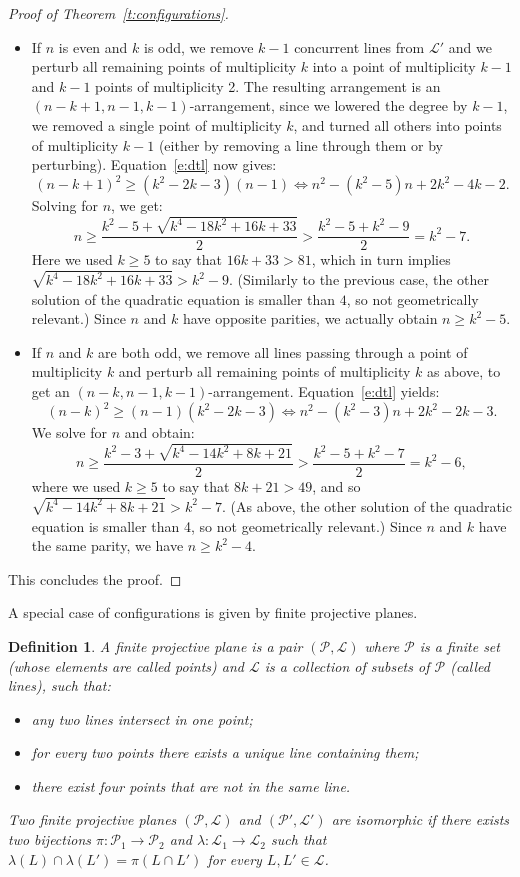 \documentclass[a4paper,12pt, onesided]{amsart}
\newtheorem{defn}[thm]{Definition}
\theoremstyle{remark}
\numberwithin{figure}{section}
\numberwithin{equation}{section}
\renewcommand{\L}{\mathcal{L}}
\newcommand{\co}{\colon}
\begin{document}
\begin{proof}[Proof of Theorem~\ref{t:configurations}]
\begin{itemize}
\item If $n$ is even and $k$ is odd, we remove $k-1$ concurrent lines from $\L'$ and we perturb all remaining points of multiplicity $k$ into a point of multiplicity $k-1$ and $k-1$ points of multiplicity 2. The resulting arrangement is an $(n-k+1,n-1,k-1)$-arrangement, since we lowered the degree by $k-1$, we removed a single point of multiplicity $k$, and turned all others into points of multiplicity $k-1$ (either by removing a line through them or by perturbing). Equation~\eqref{e:dtl} now gives:
\[
(n-k+1)^2 \ge (k^2-2k-3)(n-1)  \Longleftrightarrow  n^2 - (k^2-5)n + 2k^2-4k-2.
\]
Solving for $n$, we get:
\[
n \ge \frac{k^2 - 5 + \sqrt{k^4-18k^2 + 16k + 33}}2 > \frac{k^2 - 5 + k^2- 9}2 = k^2-7.
\]
Here we used $k \ge 5$ to say that $16k+33 > 81$, which in turn implies $\sqrt{k^4-18k^2 + 16k + 33} > k^2-9$.
(Similarly to the previous case, the other solution of the quadratic equation is smaller than $4$, so not geometrically relevant.)
Since $n$ and $k$ have opposite parities, we actually obtain $n \ge k^2-5$.

\item If $n$ and $k$ are both odd, we remove all lines passing through a point of multiplicity $k$ and perturb all remaining points of multiplicity $k$ as above, to get an $(n-k,n-1,k-1)$-arrangement.
Equation~\eqref{e:dtl} yields:
\[
(n-k)^2 \ge (n-1)(k^2-2k-3) \Longleftrightarrow n^2 - (k^2-3)n + 2k^2-2k-3.
\]
We solve for $n$ and obtain:
\[
n \ge \frac{k^2 - 3 + \sqrt{k^4-14k^2 + 8k + 21}}2 > \frac{k^2 - 5 + k^2- 7}2 = k^2-6,
\]
where we used $k \ge 5$ to say that $8k+21 > 49$, and so $\sqrt{k^4-14k^2 + 8k + 21} > k^2-7$.
(As above, the other solution of the quadratic equation is smaller than 4, so not geometrically relevant.)
Since $n$ and $k$ have the same parity, we have $n \ge k^2-4$.
\end{itemize}
This concludes the proof.
\end{proof}

A special case of configurations is given by finite projective planes.

\begin{defn}
A \emph{finite projective plane} is a pair $(\mathcal{P}, \L)$ where $\mathcal{P}$ is a finite set (whose elements are called \emph{points}) and $\mathcal{L}$ is a collection of subsets of $\mathcal{P}$ (called \emph{lines}), such that:
\begin{itemize}
\item any two lines intersect in one point;
\item for every two points there exists a unique line containing them;
\item there exist four points that are not in the same line.
\end{itemize}
Two finite projective planes $(\mathcal{P}, \L)$ and $(\mathcal{P}', \L')$ are \emph{isomorphic} if there exists two bijections $\pi \co \mathcal{P}_1 \to \mathcal{P}_2$ and $\lambda\co \L_1 \to \L_2$ such that $\lambda(L) \cap \lambda(L') = \pi(L \cap L')$ for every $L, L' \in \L$.
\end{defn}
\end{document}
